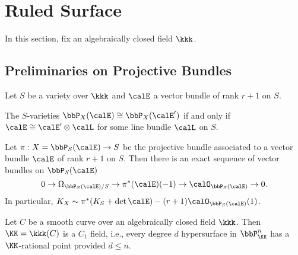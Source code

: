\section{Ruled Surface}

In this section, fix an algebraically closed field $\kkk$.

\subsection{Preliminaries on Projective Bundles}

    Let \(S\) be a variety over \(\kkk\) and \(\calE\) a vector bundle of rank \(r+1\) on \(S\).

    \begin{proposition}\label{prop:isomorphic_projective_bundle_iff_twist_by_line_bundle}
        The \(S\)-varieties \(\bbP_X(\calE) \cong \bbP_X(\calE')\) if and only if \(\calE \cong \calE' \otimes \calL\) for some line bundle \(\calL\) on \(S\).
    \end{proposition}

    \begin{theorem}\label{thm:Eulur_sequence_for_projective_bundle}
        Let \(\pi: X=\bbP_S(\calE) \to S\) be the projective bundle associated to a vector bundle \(\calE\) of rank \(r+1\) on \(S\). 
        Then there is an exact sequence of vector bundles on \(\bbP_S(\calE)\)
        \[
            0 \to \Omega_{\bbP_S(\calE)/S} \to \pi^*(\calE)(-1) \to \calO_{\bbP_S(\calE)} \to 0.
        \]
        In particular, \(K_X \sim \pi^*(K_S + \det \calE) - (r+1)\calO_{\bbP_S(\calE)}(1)\).
    \end{theorem}

    \begin{theorem}\label{thm:Tsen_theorem}
        Let \(C\) be a smooth curve over an algebraically closed field \(\kkk\). 
        Then \(\KK=\kkk(C)\) is a \(C_1\) field, i.e., every degree \(d\) hypersurface in \(\bbP^n_{\KK}\) has a \(\KK\)-rational point provided \(d \leq n\).
    \end{theorem}

